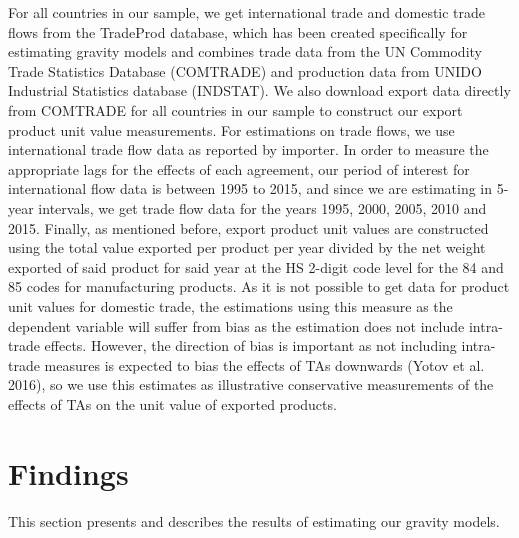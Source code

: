 \documentclass[12pt]{article}%
\begin{document}
For all countries in our sample, we get international trade and domestic
trade flows from the TradeProd database, which has been created
specifically for estimating gravity models and combines trade data from
the UN Commodity Trade Statistics Database (COMTRADE) and production
data from UNIDO Industrial Statistics database (INDSTAT). We also
download export data directly from COMTRADE for all countries in our
sample to construct our export product unit value measurements. For
estimations on trade flows, we use international trade flow data as
reported by importer. In order to measure the appropriate lags for the
effects of each agreement, our period of interest for international flow
data is between 1995 to 2015, and since we are estimating in 5-year
intervals, we get trade flow data for the years 1995, 2000, 2005, 2010
and 2015. Finally, as mentioned before, export product unit values are
constructed using the total value exported per product per year divided
by the net weight exported of said product for said year at the HS
2-digit code level for the 84 and 85 codes for manufacturing products.
As it is not possible to get data for product unit values for domestic
trade, the estimations using this measure as the dependent variable will
suffer from bias as the estimation does not include intra-trade effects.
However, the direction of bias is important as not including intra-trade
measures is expected to bias the effects of TAs downwards (Yotov et al.
2016), so we use this estimates as illustrative conservative
measurements of the effects of TAs on the unit value of exported
products.

%
\section{Findings}%
\label{sec:Findings}%
This section presents and describes the results of estimating our gravity models.

%
\end{document}
